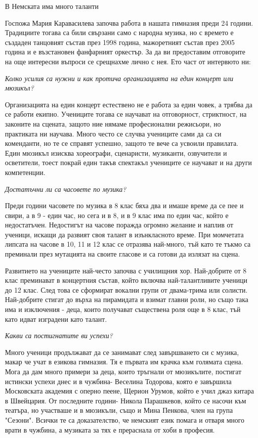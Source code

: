 \begin{multicols}{3}В Немската има много таланти

Госпожа Мария Каравасилева започва работа в нашата гимназия преди 24 години. Традициите тогава са били свързани само с народна музика, но с времето е създаден танцовият състав през 1998 година, мажоретният състав през 2005 година и е възстановен фанфарният оркестър. За да ви предоставим отговорите на още интересни въпроси се срещнахме лично с нея. Ето част от интервюто ни:

\textit{Колко усилия са нужни и как протича организацията на един концерт или мюзикъл?}

Организацията на един концерт естествено не е работа за един човек, а трябва да се работи екипно. Учениците тогава се научават на отговорност, стриктност, на законите на сцената, защото ние нямаме професионални режисьори, но практиката ни научава. Много често се случва учениците сами да са си коменданти, но те се справят успешно, защото те вече са усвоили правилата. Един мюзикъл изисква хореографи, сценаристи, музиканти, озвучители и осветители, тоест покрай един такъв спектакъл учениците се научават и на други компетенции.

\textit{Достатъчни ли са часовете по музика?}

Преди години часовете по музика в 8 клас бяха два и имаше време да се пее и свири, а в 9 - един час, но сега и в 8, и в 9 клас има по един час, който е недостатъчен. Недостигът на часове поражда огромно желание и наплив от ученици, искащи да развият своя талант в изънкласното време. При момчетата липсата на часове в 10, 11 и 12 клас се отразява най-много, тъй като те тъкмо са преминали през мутацията на своите гласове и са готови да излязат на сцена.

Развитието на учениците най-често започва с училищния хор. Най-добрите от 8 клас преминават в концертния състав, който включва най-талантливите ученици  до 12 клас. След това се сформират вокални групи от двама-трима или солисти. Най-добрите стигат до върха на пирамидата и взимат главни роли, но също така има и изключения - деца, които получават съществена роля още в 8 клас, тъй като идват изградени като талант.

\textit{Какви са постигнатите ви успехи?}

Много ученици продължават да се занимават след завършването си с музика, макар че учат в езикова гимназия. Тя е първата им крачка към голямата сцена. Мога да дам много примери за деца, които тръгнали от мюзикълите, постигат истински успехи днес и в чужбина- Веселина Тодорова, която е завършила Московската академия с оперно пеене, Щерион Урумов, който е учил джаз китара в Швейцария. От последните години- Никола Парашкевов, който се насочи към театъра, но участваше и в мюзикъли, също и Мина Пенкова, член на група "Сезони". Всички те са доказателство, че немският език помага и отваря много врати в чужбина, а музиката за тях е прераснала от хоби в професия.
\closearticle
\end{multicols}
